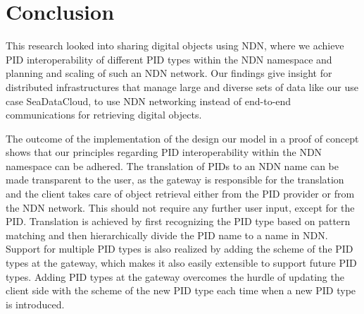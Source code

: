 \section{Conclusion}\label{conc}



This research looked into sharing digital objects using NDN, where we achieve PID interoperability of different PID types within the NDN namespace and planning and scaling of such an NDN network. Our findings give insight for distributed infrastructures that manage large and diverse sets of data like our use case SeaDataCloud, to use NDN networking instead of end-to-end communications for retrieving digital objects.

The outcome of the implementation of the design our model in a proof of concept shows that our principles regarding PID interoperability within the NDN namespace can be adhered. The translation of PIDs to an NDN name can be made transparent to the user, as the gateway is responsible for the translation and the client takes care of object retrieval either from the PID provider or from the NDN network. This should not require any further user input, except for the PID. Translation is achieved by first recognizing the PID type based on pattern matching and then hierarchically divide the PID name to a name in NDN. Support for multiple PID types is also realized by adding the scheme of the PID types at the gateway, which makes it also easily extensible to support future PID types. Adding PID types at the gateway overcomes the hurdle of updating the client side with the scheme of the new PID type each time when a new PID type is introduced.

